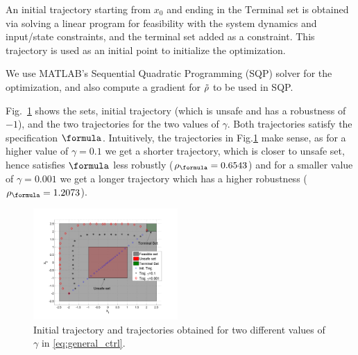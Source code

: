 An initial trajectory starting from $x_0$ and ending in the $\text{Terminal}$ set is obtained via solving a linear program for feasibility with the system dynamics and input/state constraints, and the terminal set added as a constraint. This trajectory is used as an initial point to initialize the optimization.

We use MATLAB's Sequential Quadratic Programming (SQP) solver for the optimization, and also compute a gradient for $\tilde{\rho}$ to be used in SQP.

Fig.~\ref{fig:toy control} shows the sets, initial trajectory (which is unsafe and has a robustness of $-1$), and the two trajectories for the two values of $\gamma$. Both trajectories satisfy the specification $\formula$. Intuitively, the trajectories in Fig.\ref{fig:toy control} make sense, as for a higher value of $\gamma=0.1$ we get a shorter trajectory, which is closer to unsafe set, hence satisfies $\formula$ less robustly ($\rob_{\formula}=0.6543$) and for a smaller value of $\gamma=0.001$ we get a longer trajectory which has a higher robustness ($\rob_{\formula}=1.2073$).

\begin{figure}[t]
\centering
\includegraphics[width=0.49\textwidth]{figures/ToyExampleControl}
\caption{Initial trajectory and trajectories obtained for two different values of $\gamma$ in \eqref{eq:general_ctrl}.}
\label{fig:toy control}
\end{figure}